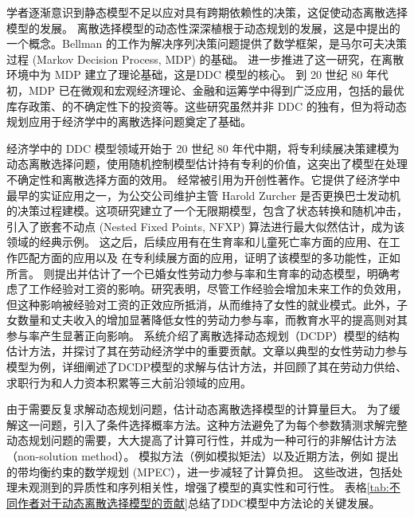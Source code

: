 \documentclass[a4paper, zihao=-4, fontset = mac, oneside]{ctexbook} %
\begin{document}
学者逐渐意识到静态模型不足以应对具有跨期依赖性的决策，这促使动态离散选择模型的发展。 离散选择模型的动态性深深植根于动态规划的发展，这是\textcite{bellmanDynamicProgramming1957}中提出的一个概念。Bellman 的工作为解决序列决策问题提供了数学框架，是马尔可夫决策过程 (Markov Decision Process, MDP) 的基础。 
\textcite{blackwellDiscreteDynamicProgramming1962}进一步推进了这一研究，在离散环境中为 MDP 建立了理论基础，这是DDC 模型的核心。
到 20 世纪 80 年代初，MDP 已在微观和宏观经济理论、金融和运筹学中得到广泛应用，包括\textcite{arrowOptimalInventoryPolicy1951}的最优库存政策、\textcite{lucasInvestmentUncertainty1971}的不确定性下的投资等。这些研究虽然并非 DDC 的独有，但为将动态规划应用于经济学中的离散选择问题奠定了基础。

经济学中的 DDC 模型领域开始于 20 世纪 80 年代中期，\textcite{pakesPatentsOptionsEstimates1986}将专利续展决策建模为动态离散选择问题，使用随机控制模型估计持有专利的价值，这突出了模型在处理不确定性和离散选择方面的效用。
\textcite{rustOptimalReplacementGMC1987}经常被引用为开创性著作。它提供了经济学中最早的实证应用之一，为公交公司维护主管 Harold Zurcher 是否更换巴士发动机的决策过程建模。这项研究建立了一个无限期模型，包含了状态转换和随机冲击，引入了嵌套不动点 (Nested Fixed Points, NFXP) 算法进行最大似然估计，成为该领域的经典示例。
这之后，后续应用有\textcite{wolpinEstimableDynamicStochastic1984}在生育率和儿童死亡率方面的应用、\textcite{millerCultureDevelopmentEveryday1984}在工作匹配方面的应用以及\textcite{pakesPatentsOptionsEstimates1986} 在专利续展方面的应用，证明了该模型的多功能性，正如\textcite{aguirregabiriaDynamicDiscreteChoice2010}所言。
\textcite{ecksteinDynamicLabourForce1989}则提出并估计了一个已婚女性劳动力参与率和生育率的动态模型，明确考虑了工作经验对工资的影响。研究表明，尽管工作经验会增加未来工作的负效用，但这种影响被经验对工资的正效应所抵消，从而维持了女性的就业模式。此外，子女数量和丈夫收入的增加显著降低女性的劳动力参与率，而教育水平的提高则对其参与率产生显著正向影响。
\textcite{keaneStructuralEstimationBehavioral2011}系统介绍了离散选择动态规划（DCDP）模型的结构估计方法，并探讨了其在劳动经济学中的重要贡献。文章以典型的女性劳动力参与模型为例，详细阐述了DCDP模型的求解与估计方法，并回顾了其在劳动力供给、求职行为和人力资本积累等三大前沿领域的应用。


由于需要反复求解动态规划问题，估计动态离散选择模型的计算量巨大。
为了缓解这一问题，\textcite{hotzConditionalChoiceProbabilities1993}引入了条件选择概率方法。这种方法避免了为每个参数猜测求解完整动态规划问题的需要，大大提高了计算可行性，并成为一种可行的非解估计方法（non-solution method）。
模拟方法（例如模拟矩法）以及近期方法，例如 \textcite{suConstrainedOptimizationApproaches2012}提出的带均衡约束的数学规划 (MPEC），进一步减轻了计算负担。
这些改进，包括处理未观测到的异质性和序列相关性，增强了模型的真实性和可行性。
表格\ref{tab:不同作者对于动态离散选择模型的贡献}总结了DDC模型中方法论的关键发展。
\end{document}
